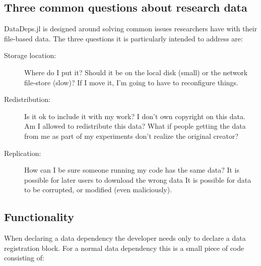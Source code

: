 \documentclass[twoside,11pt]{article}\usepackage{jmlr2e}
\begin{document}
\subsection{Three common questions about research data}
DataDeps.jl is designed around solving common issues researchers have with their file-based data.
The three questions it is particularly intended to address are:

\begin{description}
	\item[Storage location:] Where do I put it? \label{itm:where}
		Should it be on the local disk (small) or the network file-store (slow)?
		If I move it, I'm going to have to reconfigure things.
	\item[Redistribution:] Is it ok to include it with my work? \label{itm:ownredistribute} I don't own copyright on this data.
		Am I allowed to redistribute this data?
		What if people getting the data from me as part of my experiments don't realize the original creator?
	\item[Replication:] How can I be sure someone running my code has the same data?
	It is possible for later users to download the wrong data
	It is possible for data to be corrupted, or modified (even maliciously).
\end{description}

\subsection{Functionality}
When declaring a data dependency the developer needs only to declare a data registration block.
For a normal data dependency this is a small piece of code consisting of:
\end{document}
